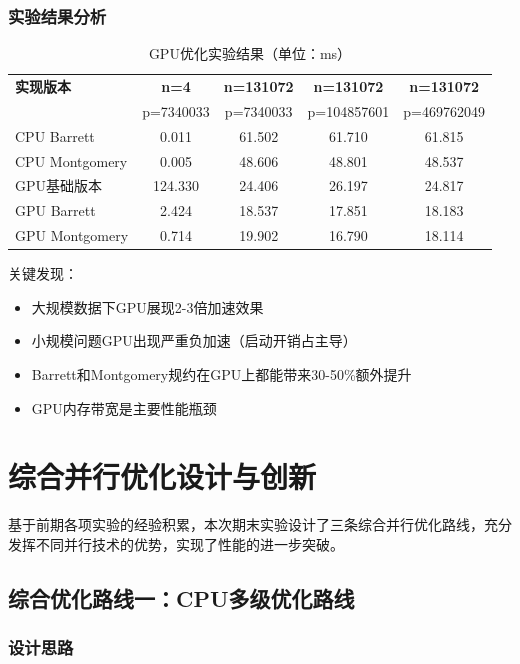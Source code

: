 \documentclass[a4paper]{article}
\begin{document}
	\subsubsection{实验结果分析}
	
	\begin{table}[H]
		\centering
		\caption{GPU优化实验结果（单位：ms）}
		\begin{tabular}{|l|c|c|c|c|}
			\hline
			\textbf{实现版本} & \textbf{n=4} & \textbf{n=131072} & \textbf{n=131072} & \textbf{n=131072} \\
			& p=7340033 & p=7340033 & p=104857601 & p=469762049 \\
			\hline
			CPU Barrett & 0.011 & 61.502 & 61.710 & 61.815 \\
			\hline
			CPU Montgomery & 0.005 & 48.606 & 48.801 & 48.537 \\
			\hline
			GPU基础版本 & 124.330 & 24.406 & 26.197 & 24.817 \\
			\hline
			GPU Barrett & 2.424 & 18.537 & 17.851 & 18.183 \\
			\hline
			GPU Montgomery & 0.714 & 19.902 & 16.790 & 18.114 \\
			\hline
		\end{tabular}
	\end{table}
	
	关键发现：
	\begin{itemize}
		\item 大规模数据下GPU展现2-3倍加速效果
		\item 小规模问题GPU出现严重负加速（启动开销占主导）
		\item Barrett和Montgomery规约在GPU上都能带来30-50\%额外提升
		\item GPU内存带宽是主要性能瓶颈
	\end{itemize}
	
	\section{综合并行优化设计与创新}
	
	基于前期各项实验的经验积累，本次期末实验设计了三条综合并行优化路线，充分发挥不同并行技术的优势，实现了性能的进一步突破。
	
	\subsection{综合优化路线一：CPU多级优化路线}
	
	\subsubsection{设计思路}
	
\end{document}
